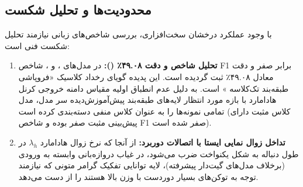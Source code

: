 \subsection{محدودیت‌ها و تحلیل شکست}
با وجود عملکرد درخشان سخت‌افزاری، بررسی شاخص‌های زبانی نیازمند تحلیل شکست فنی است:
\begin{enumerate}
    \item \textbf{تحلیل شاخص  و دقت ۴۹.۰۸٪ ():} در مدل‌های ،  و ، شاخص F1 برابر صفر و دقت معادل ۴۹.۰۸٪ ثبت گردیده است. این پدیده گویای رخداد کلاسیک «فروپاشی طبقه‌بند تک‌کلاسه » است. به دلیل عدم انطباق اولیه مقیاس دامنه خروجی کرنل هادامارد با بازه مورد انتظار لایه‌های طبقه‌بند پیش‌آموزش‌دیده سر مدل، مدل تمامی نمونه‌ها را به عنوان کلاس منفی دسته‌بندی کرده است (کلاس مثبت دارای پیش‌بینی مثبت صفر بوده و شاخص F1 صفر شده است).
    \item \textbf{تداخل زوال نمایی ایستا با اتصالات دوربرد:} از آنجا که نرخ زوال هادامارد $\lambda_h$ در طول دنباله به شکل یکنواخت ضرب می‌شود، در غیاب دروازه‌بانی وابسته به ورودی (برخلاف مدل‌های گیت‌دار پیشرفته)، لایه توانایی تفکیک گرامر متونی که نیازمند توجه به توکن‌های بسیار دوردست با وزن بالا هستند را از دست می‌دهد.
\end{enumerate}
